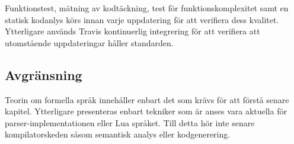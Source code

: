 Funktionstest, mätning av kodtäckning, test för funktionskomplexitet samt en
statisk kodanlys körs innan varje uppdatering för att verifiera dess
kvalitet. Ytterligare används Travis kontinuerlig integrering för att
verifiera att utomstående uppdateringar håller standarden.

\subsection{Avgränsning}

Teorin om formella språk innehåller enbart det som krävs för att förstå senare
kapitel. Ytterligare presenteras enbart tekniker som är anses vara aktuella
för parser-implementationen eller Lua språket. Till detta hör inte senare
kompilatorskeden såsom semantisk analys eller kodgenerering.

